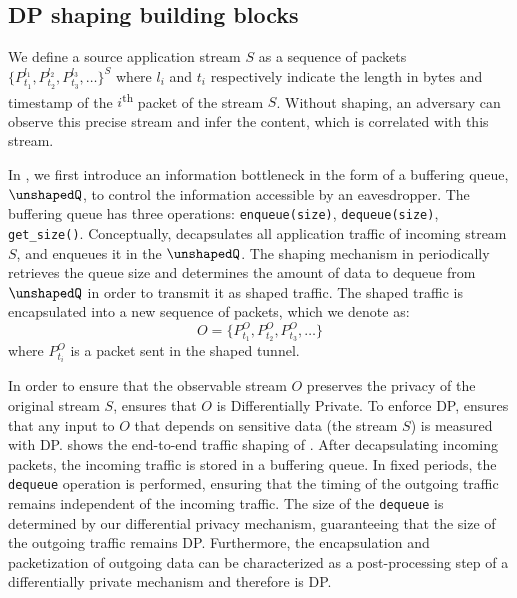 

\subsection{DP shaping building blocks}
\label{subsec:infromation-bottleneck}
We define a source application stream $S$ as a sequence of packets
$\{P_{t_1}^{l_1}, P_{t_2}^{l_2}, P_{t_3}^{l_3}, \dots \}^S$
where $l_i$ and $t_i$ respectively indicate the length in bytes and timestamp of
the $i$\textsuperscript{th} packet of the stream $S$.
%
Without shaping, an adversary can observe this precise stream and infer
the content, which is correlated with this stream.

In {\sys}, we first introduce an information bottleneck in the form of a
buffering queue, {$\unshapedQ$}, to control the information accessible by an
eavesdropper. The buffering queue has three operations: \texttt{enqueue(size)},
\texttt{dequeue(size)}, \texttt{get\_size()}.
Conceptually, {\sys} decapsulates all application traffic of incoming stream
$S$, and enqueues it in the {$\unshapedQ$}.
The shaping mechanism in {\sys} periodically retrieves the queue size and
determines the amount of data to dequeue from $\unshapedQ$ in order to transmit
it as shaped traffic.
The shaped traffic is encapsulated into a new sequence of packets, which we
denote as:
\begin{equation}\label{equ:stream-segs}
    O = \{P_{t_1}^O, P_{t_2}^O, P_{t_3}^O, \dots\}
\end{equation}
where $P_{t_i}^O$ is a packet sent in the shaped tunnel.

In order to ensure that the observable stream $O$ preserves the privacy of the
original stream $S$, {\sys} ensures that $O$ is Differentially Private.
To enforce DP, {\sys} ensures that any input to $O$ that depends on sensitive
data (the stream $S$) is measured with DP.
 shows the end-to-end traffic shaping of {\sys}.
After decapsulating incoming packets, the incoming traffic is stored in a
buffering queue. In fixed periods, the \texttt{dequeue} operation is performed,
ensuring that the timing of the outgoing traffic remains independent of the
incoming traffic. The size of the \texttt{dequeue} is determined by our
differential privacy mechanism, guaranteeing that the size of the outgoing
traffic remains DP.
Furthermore, the encapsulation and packetization of outgoing data can be
characterized as a post-processing step of a differentially private mechanism
and therefore is DP.
\fi


